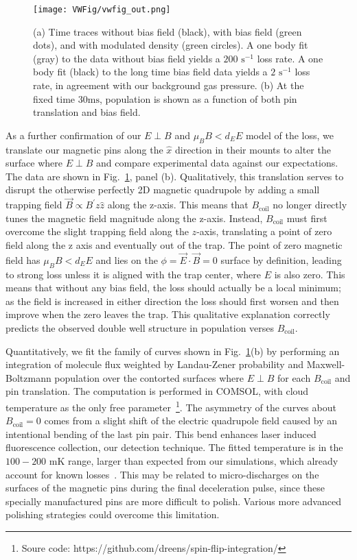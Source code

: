 \documentclass[%
 reprint,
groupedaddress,
 amsmath,amssymb,
 aps,
prl,
]{revtex4-1}
\newcommand{\epb}{{$E\!\perp\!B$}}
\begin{document}
\begin{figure}[tb]
\texttt{[image: VWFig/vwfig\_out.png]}%
\caption{
(a) Time traces without bias field (black), with bias field (green dots), and with modulated density (green circles). A one body fit (gray) to the data without bias field yields a $200\text{ s}^{-1}$ loss rate. A one body fit (black) to the long time bias field data yields a $2\text{ s}^{-1}$ loss rate, in agreement with our background gas pressure. (b) At the fixed time $30 \text{ms}$, population is shown as a function of both pin translation and bias field.
\label{fig:WVplot}}
\end{figure}


As a further confirmation of our \epb{}  and $\mu_BB<d_EE$ model of the loss, we translate our magnetic pins along the $\hat{x}$ direction in their mounts to alter the surface where \epb{}  and compare experimental data against our expectations. The data are shown in Fig.~\ref{fig:WVplot}, panel (b). Qualitatively, this translation serves to disrupt the otherwise perfectly 2D magnetic quadrupole by adding a small trapping field $\vec{B}\propto B^\prime z\hat{z}$ along the z-axis. This means that $B_\text{coil}$ no longer directly tunes the magnetic field magnitude along the z-axis. Instead, $B_\text{coil}$ must first overcome the slight trapping field along the $z$-axis, translating a point of zero field along the z axis and eventually out of the trap. The point of zero magnetic field has $\mu_BB<d_EE$ and lies on the $\phi=\vec{E}\cdot\vec{B}=0$ surface by definition, leading to strong loss unless it is aligned with the trap center, where $E$ is also zero. This means that without any bias field, the loss should actually be a local minimum; as the field is increased in either direction the loss should first worsen and then improve when the zero leaves the trap. This qualitative explanation correctly predicts the observed double well structure in population verses $B_\text{coil}$.

Quantitatively, we fit the family of curves shown in Fig.~\ref{fig:WVplot}(b) by performing an integration of molecule flux weighted by Landau-Zener probability and Maxwell-Boltzmann population over the contorted surfaces where \epb{} for each $B_\text{coil}$ and pin translation. The computation is performed in COMSOL, with cloud temperature as the only free parameter~\footnote{Soure code: https://github.com/dreens/spin-flip-integration/}. The asymmetry of the curves about $B_\text{coil}=0$ comes from a slight shift of the electric quadrupole field caused by an intentional bending of the last pin pair. This bend enhances laser induced fluorescence collection, our detection technique. The fitted temperature is in the $100-200$ mK range, larger than expected from our simulations, which already account for known losses~\cite{Sawyer2008a}. This may be related to micro-discharges on the surfaces of the magnetic pins during the final deceleration pulse, since these specially manufactured pins are more difficult to polish. Various more advanced polishing strategies could overcome this limitation.
\end{document}

